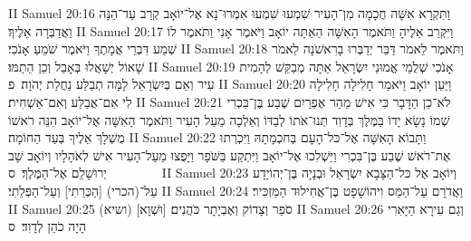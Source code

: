 II Samuel 20:16	וַתִּקְרָא אִשָּׁה חֲכָמָה מִן־הָעִיר שִׁמְעוּ שִׁמְעוּ אִמְרוּ־נָא אֶל־יוֹאָב קְרַב עַד־הֵנָּה וַאֲדַבְּרָה אֵלֶיךָ׃
II Samuel 20:17	וַיִּקְרַב אֵלֶיהָ וַתֹּאמֶר הָאִשָּׁה הַאַתָּה יוֹאָב וַיֹּאמֶר אָנִי וַתֹּאמֶר לוֹ שְׁמַע דִּבְרֵי אֲמָתֶךָ וַיֹּאמֶר שֹׁמֵעַ אָנֹכִי׃
II Samuel 20:18	וַתֹּאמֶר לֵאמֹר דַּבֵּר יְדַבְּרוּ בָרִאשֹׁנָה לֵאמֹר שָׁאוֹל יְשָׁאֲלוּ בְּאָבֵל וְכֵן הֵתַמּוּ׃
II Samuel 20:19	אָנֹכִי שְׁלֻמֵי אֱמוּנֵי יִשְׂרָאֵל אַתָּה מְבַקֵּשׁ לְהָמִית עִיר וְאֵם בְּיִשְׂרָאֵל לָמָּה תְבַלַּע נַחֲלַת יְהֹוָה׃ {פ}
II Samuel 20:20	וַיַּעַן יוֹאָב וַיֹּאמַר חָלִילָה חָלִילָה לִי אִם־אֲבַלַּע וְאִם־אַשְׁחִית׃
II Samuel 20:21	לֹא־כֵן הַדָּבָר כִּי אִישׁ מֵהַר אֶפְרַיִם שֶׁבַע בֶּן־בִּכְרִי שְׁמוֹ נָשָׂא יָדוֹ בַּמֶּלֶךְ בְּדָוִד תְּנוּ־אֹתוֹ לְבַדּוֹ וְאֵלְכָה מֵעַל הָעִיר וַתֹּאמֶר הָאִשָּׁה אֶל־יוֹאָב הִנֵּה רֹאשׁוֹ מֻשְׁלָךְ אֵלֶיךָ בְּעַד הַחוֹמָה׃
II Samuel 20:22	וַתָּבוֹא הָאִשָּׁה אֶל־כּל־הָעָם בְּחכְמָתָהּ וַיִּכְרְתוּ אֶת־רֹאשׁ שֶׁבַע בֶּן־בִּכְרִי וַיַּשְׁלִכוּ אֶל־יוֹאָב וַיִּתְקַע בַּשֹּׁפָר וַיָּפֻצוּ מֵעַל־הָעִיר אִישׁ לְאֹהָלָיו וְיוֹאָב שָׁב יְרוּשָׁלַ͏ִם אֶל־הַמֶּלֶךְ׃ {ס}        
II Samuel 20:23	וְיוֹאָב אֶל כּל־הַצָּבָא יִשְׂרָאֵל וּבְנָיָה בֶּן־יְהוֹיָדָע עַל־(הכרי) [הַכְּרֵתִי] וְעַל־הַפְּלֵתִי׃
II Samuel 20:24	וַאֲדֹרָם עַל־הַמַּס וִיהוֹשָׁפָט בֶּן־אֲחִילוּד הַמַּזְכִּיר׃
II Samuel 20:25	(ושיא) [וּשְׁוָא] סֹפֵר וְצָדוֹק וְאֶבְיָתָר כֹּהֲנִים׃
II Samuel 20:26	וְגַם עִירָא הַיָּאִרִי הָיָה כֹהֵן לְדָוִד׃ {ס}        
